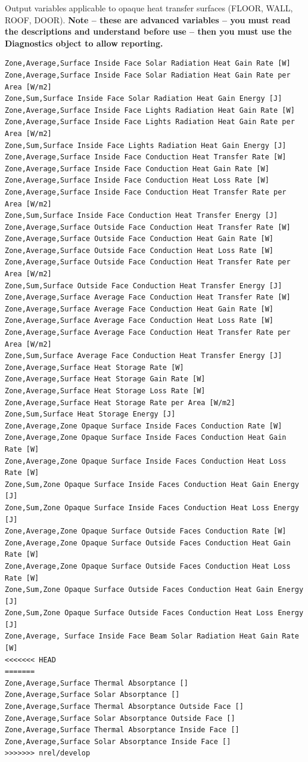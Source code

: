 Output variables applicable to opaque heat transfer surfaces (FLOOR, WALL, ROOF, DOOR). \textbf{Note -- these are advanced variables -- you must read the descriptions and understand before use -- then you must use the Diagnostics object to allow reporting.}

\begin{lstlisting}
Zone,Average,Surface Inside Face Solar Radiation Heat Gain Rate [W]
Zone,Average,Surface Inside Face Solar Radiation Heat Gain Rate per Area [W/m2]
Zone,Sum,Surface Inside Face Solar Radiation Heat Gain Energy [J]
Zone,Average,Surface Inside Face Lights Radiation Heat Gain Rate [W]
Zone,Average,Surface Inside Face Lights Radiation Heat Gain Rate per Area [W/m2]
Zone,Sum,Surface Inside Face Lights Radiation Heat Gain Energy [J]
Zone,Average,Surface Inside Face Conduction Heat Transfer Rate [W]
Zone,Average,Surface Inside Face Conduction Heat Gain Rate [W]
Zone,Average,Surface Inside Face Conduction Heat Loss Rate [W]
Zone,Average,Surface Inside Face Conduction Heat Transfer Rate per Area [W/m2]
Zone,Sum,Surface Inside Face Conduction Heat Transfer Energy [J]
Zone,Average,Surface Outside Face Conduction Heat Transfer Rate [W]
Zone,Average,Surface Outside Face Conduction Heat Gain Rate [W]
Zone,Average,Surface Outside Face Conduction Heat Loss Rate [W]
Zone,Average,Surface Outside Face Conduction Heat Transfer Rate per Area [W/m2]
Zone,Sum,Surface Outside Face Conduction Heat Transfer Energy [J]
Zone,Average,Surface Average Face Conduction Heat Transfer Rate [W]
Zone,Average,Surface Average Face Conduction Heat Gain Rate [W]
Zone,Average,Surface Average Face Conduction Heat Loss Rate [W]
Zone,Average,Surface Average Face Conduction Heat Transfer Rate per Area [W/m2]
Zone,Sum,Surface Average Face Conduction Heat Transfer Energy [J]
Zone,Average,Surface Heat Storage Rate [W]
Zone,Average,Surface Heat Storage Gain Rate [W]
Zone,Average,Surface Heat Storage Loss Rate [W]
Zone,Average,Surface Heat Storage Rate per Area [W/m2]
Zone,Sum,Surface Heat Storage Energy [J]
Zone,Average,Zone Opaque Surface Inside Faces Conduction Rate [W]
Zone,Average,Zone Opaque Surface Inside Faces Conduction Heat Gain Rate [W]
Zone,Average,Zone Opaque Surface Inside Faces Conduction Heat Loss Rate [W]
Zone,Sum,Zone Opaque Surface Inside Faces Conduction Heat Gain Energy [J]
Zone,Sum,Zone Opaque Surface Inside Faces Conduction Heat Loss Energy [J]
Zone,Average,Zone Opaque Surface Outside Faces Conduction Rate [W]
Zone,Average,Zone Opaque Surface Outside Faces Conduction Heat Gain Rate [W]
Zone,Average,Zone Opaque Surface Outside Faces Conduction Heat Loss Rate [W]
Zone,Sum,Zone Opaque Surface Outside Faces Conduction Heat Gain Energy [J]
Zone,Sum,Zone Opaque Surface Outside Faces Conduction Heat Loss Energy [J]
Zone,Average, Surface Inside Face Beam Solar Radiation Heat Gain Rate [W]
<<<<<<< HEAD
=======
Zone,Average,Surface Thermal Absorptance []
Zone,Average,Surface Solar Absorptance []
Zone,Average,Surface Thermal Absorptance Outside Face []
Zone,Average,Surface Solar Absorptance Outside Face []
Zone,Average,Surface Thermal Absorptance Inside Face []
Zone,Average,Surface Solar Absorptance Inside Face []
>>>>>>> nrel/develop
\end{lstlisting}

